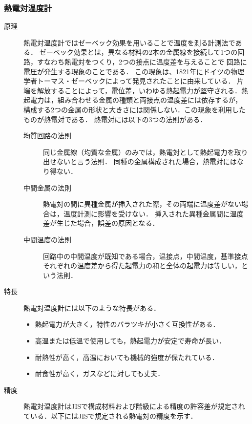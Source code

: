 \documentclass[a4paper,11pt,uplatex]{jsarticle}
\begin{document}
\subsubsection{熱電対温度計}
\begin{description}
  \item[原理] 熱電対温度計ではゼーベック効果を用いることで温度を測る計測法である．
  ゼーベック効果とは，異なる材料の2本の金属線を接続して1つの回路，すなわち熱電対をつくり，2つの接点に温度差を与えることで
  回路に電圧が発生する現象のことである．
  この現象は、1821年にドイツの物理学者トーマス・ゼーベックによって発見されたことに由来している．
  片端を解放することによって，電位差，いわゆる熱起電力が堅守される．熱起電力は，組み合わせる金属の種類と両接点の温度差には依存するが，
  構成する2つの金属の形状と大きさには関係しない．この現象を利用したものが熱電対である．
  熱電対には以下の3つの法則がある．
  \begin{description}
    \item[均質回路の法則] 同じ金属線（均質な金属）のみでは，熱電対として熱起電力を取り出せないと言う法則．
    同種の金属構成された場合，熱電対にはなり得ない．
    \item[中間金属の法則] 熱電対の間に異種金属が挿入された際，その両端に温度差がない場合は，温度計測に影響を受けない．
    挿入された異種金属間に温度差が生じた場合，誤差の原因となる．
    \item[中間温度の法則] 回路中の中間温度が既知である場合，温接点，中間温度，基準接点それぞれの温度差から得た起電力の和と全体の起電力は等しい，という法則．
  \end{description}
  \item [特長] 熱電対温度計には以下のような特長がある．
  \begin{itemize}
    \item 熱起電力が大きく，特性のバラツキが小さく互換性がある．
    \item 高温または低温で使用しても，熱起電力が安定で寿命が長い．
    \item 耐熱性が高く，高温においても機械的強度が保たれている．
    \item 耐食性が高く，ガスなどに対しても丈夫．
  \end{itemize}
  \newpage
  \item [精度] 熱電対温度計はJISで構成材料および階級による精度の許容差が規定されている．以下にはJISで規定される熱電対の精度を示す．
  \begin{figure}[H]
    \begin{center}

\end{center}
\end{figure}
\end{description}
\end{document}
